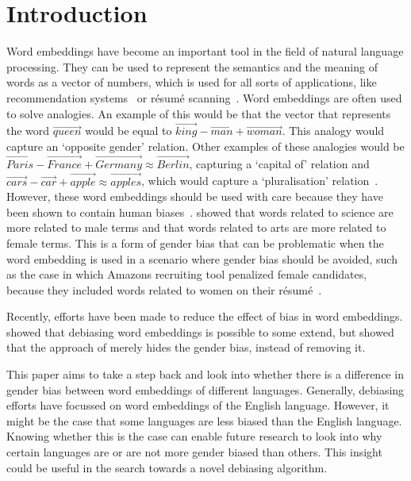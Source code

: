 \section{Introduction}
Word embeddings have become an important tool in the field of natural language
processing. They can be used to represent the semantics and the meaning of
words as a vector of numbers, which is used for all sorts of applications, like
recommendation systems~\parencite{10.1145/3219819.3219885} or résumé
scanning~\parencite{large-scale-hoang-2017}. Word
embeddings are often used to solve analogies. An example of this would be that the
vector that represents the word
$\overrightarrow{queen}$ would be equal to $\overrightarrow{king} -
\overrightarrow{man} +
\overrightarrow{woman}$. This analogy would capture an `opposite gender' relation.
Other examples of these analogies would be $\overrightarrow{Paris} -
\overrightarrow{France} + \overrightarrow{Germany} \approx \overrightarrow{Berlin}$,
capturing a `capital of' relation and
$\overrightarrow{cars} - \overrightarrow{car} + \overrightarrow{apple} \approx
\overrightarrow{apples}$, which would capture a `pluralisation' relation~\parencite{vylomova-etal-2016-take}.
However, these word embeddings should be used with care because they have been
shown to contain human
biases~\parencite{caliskan_2017_semantics_language_corpora}.
\textcite{caliskan_2017_semantics_language_corpora} showed
that words related to science are more related to male terms and that
words related to arts are more related to female terms. This is a form of gender bias
that can be problematic when the word embedding is used in a scenario where gender bias
should be avoided, such as
the case in which Amazons recruiting tool penalized female candidates, because they
included words related to women on their résumé~\parencite{dastin_2018}.

Recently, efforts have been made to reduce the effect of bias in word embeddings.
\textcite{bolukbasi_2016_quantifying_stereotypes} showed that debiasing word embeddings
is possible to some extend, but \textcite{gonen-goldberg-2019-lipstick-pig} showed that
the approach of \textcite{bolukbasi_2016_quantifying_stereotypes} merely hides the
gender bias, instead of removing it.

This paper aims to take a step back and look into whether there is a difference in gender
bias between word embeddings of different languages. Generally, debiasing efforts
have focussed on word embeddings of the English language. However, it might be the
case that some languages are less biased than the English language. Knowing whether this
is the case can enable future research to look into why certain languages are or are not
more gender biased than others. This insight could be useful in the search towards a novel
debiasing algorithm.
